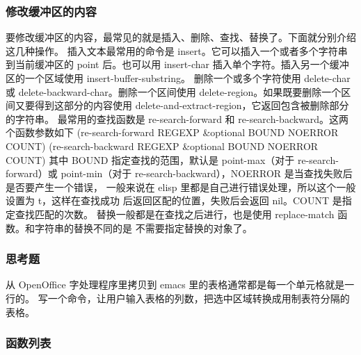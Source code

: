 \documentclass[11pt]{ctexart}
\begin{document}
{{{{\subsubsection{修改缓冲区的内容}
\label{sec:org234b488}
要修改缓冲区的内容，最常见的就是插入、删除、查找、替换了。下面就分别介绍这几种操作。
插入文本最常用的命令是 insert。它可以插入一个或者多个字符串到当前缓冲区的 point
后。也可以用 insert-char 插入单个字符。插入另一个缓冲区的一个区域使用
insert-buffer-substring。
删除一个或多个字符使用 delete-char 或 delete-backward-char。删除一个区间使用
delete-region。如果既要删除一个区间又要得到这部分的内容使用
delete-and-extract-region，它返回包含被删除部分的字符串。
最常用的查找函数是 re-search-forward 和 re-search-backward。这两个函数参数如下
(re-search-forward REGEXP \&optional BOUND NOERROR COUNT)
(re-search-backward REGEXP \&optional BOUND NOERROR COUNT)
其中 BOUND 指定查找的范围，默认是 point-max（对于 re-search-forward）或
point-min（对于 re-search-backward），NOERROR 是当查找失败后是否要产生一个错误，
一般来说在 elisp 里都是自己进行错误处理，所以这个一般设置为 t，这样在查找成功
后返回区配的位置，失败后会返回 nil。COUNT 是指定查找匹配的次数。
替换一般都是在查找之后进行，也是使用 replace-match 函数。和字符串的替换不同的是
不需要指定替换的对象了。

\subsubsection{思考题}
\label{sec:org83085a5}

从 OpenOffice 字处理程序里拷贝到 emacs 里的表格通常都是每一个单元格就是一行的。
写一个命令，让用户输入表格的列数，把选中区域转换成用制表符分隔的表格。

\subsubsection{函数列表}
\label{sec:orgfed08fd}

}}}}
\end{document}

